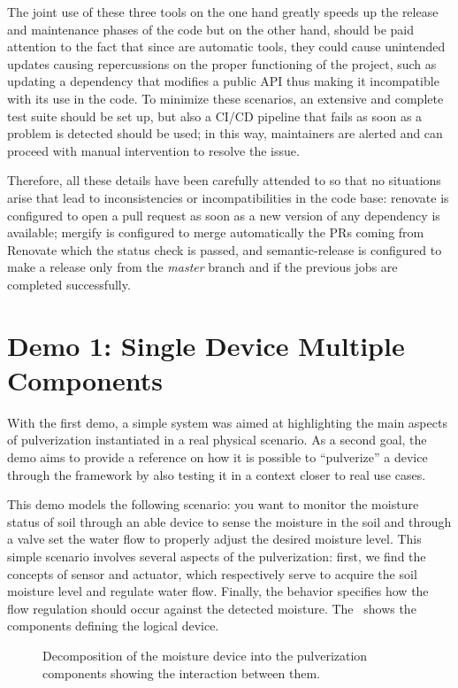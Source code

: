 The joint use of these three tools on the one hand greatly speeds up the release and maintenance phases of the code but on the other hand, should be
paid attention to the fact that since are automatic tools, they could cause unintended updates causing repercussions on the proper functioning of the
project, such as updating a dependency that modifies a public API thus making it incompatible with its use in the code. To minimize these scenarios,
an extensive and complete test suite should be set up, but also a CI/CD pipeline that fails as soon as a problem is detected should be used; in this
way, maintainers are alerted and can proceed with manual intervention to resolve the issue.

Therefore, all these details have been carefully attended to so that no situations arise that lead to inconsistencies or
incompatibilities in the code base: renovate is configured to open a pull request as soon as a new version of any dependency is available; mergify is
configured to merge automatically the PRs coming from Renovate which the status check is passed, and semantic-release is configured to make a
release only from the \emph{master} branch and if the previous jobs are completed successfully.

\section{Demo 1: Single Device Multiple Components}
\label{sec:demo-1}

With the first demo, a simple system was aimed at highlighting the main aspects of pulverization instantiated in a real physical scenario.
As a second goal, the demo aims to provide a reference on how it is possible to ``pulverize'' a device through the framework by also testing it in a
context closer to real use cases.

This demo models the following scenario: you want to monitor the moisture status of soil through an able device
to sense the moisture in the soil and through a valve set the water flow to properly adjust the desired moisture level.
This simple scenario involves several aspects of the pulverization: first, we find the concepts of sensor and actuator, which respectively serve to
acquire the soil moisture level and regulate water flow. Finally, the behavior specifies how the flow regulation should occur against
the detected moisture. The~ shows the components defining the logical device.

\begin{figure}
	\centering
	\caption{Decomposition of the moisture device into the pulverization components showing the interaction between them.}
	\label{fig:demo-1-system}
\end{figure}


